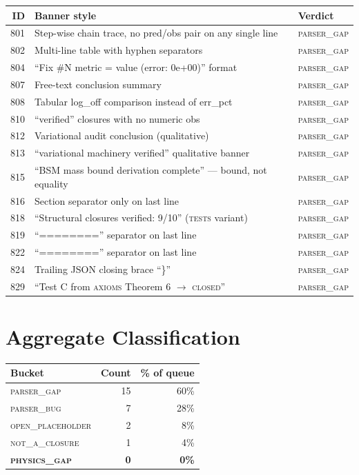\documentclass[11pt]{article}
\begin{document}
\begin{longtable}{r p{8.8cm} l}
\toprule
\textbf{ID} & \textbf{Banner style} & \textbf{Verdict} \\
\midrule \endhead
801 & Step-wise chain trace, no pred/obs pair on any single line       & \textsc{parser\_gap} \\
802 & Multi-line table with hyphen separators                          & \textsc{parser\_gap} \\
804 & ``Fix \#N metric = value (error: 0e+00)'' format                 & \textsc{parser\_gap} \\
807 & Free-text conclusion summary                                     & \textsc{parser\_gap} \\
808 & Tabular log\_off comparison instead of err\_pct                  & \textsc{parser\_gap} \\
810 & ``verified'' closures with no numeric obs                        & \textsc{parser\_gap} \\
812 & Variational audit conclusion (qualitative)                       & \textsc{parser\_gap} \\
813 & ``variational machinery verified'' qualitative banner            & \textsc{parser\_gap} \\
815 & ``BSM mass bound derivation complete'' --- bound, not equality   & \textsc{parser\_gap} \\
816 & Section separator only on last line                              & \textsc{parser\_gap} \\
818 & ``Structural closures verified: 9/10'' (\textsc{tests} variant)  & \textsc{parser\_gap} \\
819 & ``========'' separator on last line                              & \textsc{parser\_gap} \\
822 & ``========'' separator on last line                              & \textsc{parser\_gap} \\
824 & Trailing JSON closing brace ``\}''                               & \textsc{parser\_gap} \\
829 & ``Test C from \textsc{axioms} Theorem 6 $\to$ \textsc{closed}''  & \textsc{parser\_gap} \\
\bottomrule
\end{longtable}

\section{Aggregate Classification}
\begin{center}
\begin{tabular}{lrr}
\toprule
\textbf{Bucket} & \textbf{Count} & \textbf{\% of queue} \\
\midrule
\textsc{parser\_gap}        & 15 & 60\% \\
\textsc{parser\_bug}        &  7 & 28\% \\
\textsc{open\_placeholder}  &  2 &  8\% \\
\textsc{not\_a\_closure}    &  1 &  4\% \\
\textbf{\textsc{physics\_gap}} & \textbf{0} & \textbf{0\%} \\
\bottomrule
\end{tabular}
\end{center}
\end{document}
